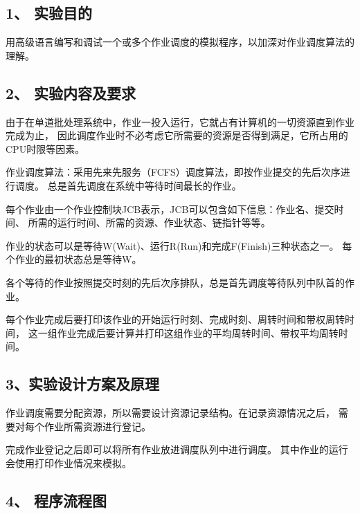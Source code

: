 \documentclass[12bp]{guo}
\begin{document}
\subsection{1、 实验目的}

用高级语言编写和调试一个或多个作业调度的模拟程序，以加深对作业调度算法的理解。

\subsection{2、 实验内容及要求}

由于在单道批处理系统中，作业一投入运行，它就占有计算机的一切资源直到作业完成为止，
因此调度作业时不必考虑它所需要的资源是否得到满足，它所占用的 CPU时限等因素。

作业调度算法：采用先来先服务（FCFS）调度算法，即按作业提交的先后次序进行调度。
总是首先调度在系统中等待时间最长的作业。


每个作业由一个作业控制块JCB表示，JCB可以包含如下信息：作业名、提交时间、
所需的运行时间、所需的资源、作业状态、链指针等等。


作业的状态可以是等待W(Wait)、运行R(Run)和完成F(Finish)三种状态之一。
每个作业的最初状态总是等待W。


各个等待的作业按照提交时刻的先后次序排队，总是首先调度等待队列中队首的作业。


每个作业完成后要打印该作业的开始运行时刻、完成时刻、周转时间和带权周转时间，
这一组作业完成后要计算并打印这组作业的平均周转时间、带权平均周转时间。


\subsection{3、实验设计方案及原理}

作业调度需要分配资源，所以需要设计资源记录结构。在记录资源情况之后，
需要对每个作业所需资源进行登记。


完成作业登记之后即可以将所有作业放进调度队列中进行调度。
其中作业的运行会使用打印作业情况来模拟。

\clearpage

\subsection{4、 程序流程图}
\end{document}
